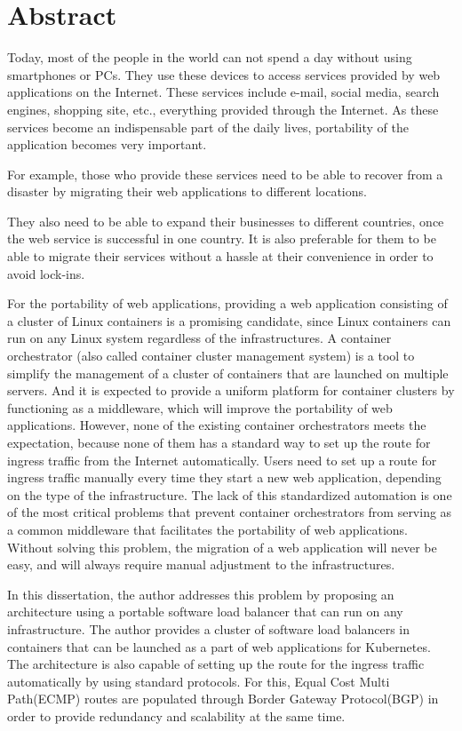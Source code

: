 \chapter*{Abstract}

Today, most of the people in the world can not spend a day without using smartphones or PCs.
They use these devices to access services provided by web applications on the Internet.
These services include e-mail, social media, search engines, shopping site, etc., everything provided through the Internet.
As these services become an indispensable part of the daily lives, portability of the application becomes very important.

For example, those who provide these services need to be able to recover from a disaster by migrating their web applications to different locations.

They also need to be able to expand their businesses to different countries, once the web service is successful in one country.
It is also preferable for them to be able to migrate their services without a hassle at their convenience in order to avoid lock-ins.


For the portability of web applications,
 providing a web application consisting of a cluster of Linux containers is a promising candidate, since Linux containers can run on any Linux system regardless of the infrastructures.
A container orchestrator (also called container cluster management system) is a tool to simplify the management of a cluster of containers that are launched on multiple servers.
And it is expected to provide a uniform platform for container clusters by functioning as a middleware, which will improve the portability of web applications.
However, none of the existing container orchestrators meets the expectation, because none of them has a standard way to set up the route for ingress traffic from the Internet automatically.
%
Users need to set up a route for ingress traffic manually every time they start a new web application, depending on the type of the infrastructure.
The lack of this standardized automation is one of the most critical problems that prevent container orchestrators from serving as a common middleware that facilitates the portability of web applications.
Without solving this problem, the migration of a web application will never be easy, and will always require manual adjustment to the infrastructures.

In this dissertation, the author addresses this problem by proposing an architecture using a portable software load balancer that can run on any infrastructure.
The author provides a cluster of software load balancers in containers that can be launched as a part of web applications for Kubernetes.
%
The architecture is also capable of setting up the route for the ingress traffic automatically by using standard protocols.
For this, Equal Cost Multi Path(ECMP) routes are populated through Border Gateway Protocol(BGP) in order to provide redundancy and scalability at the same time.

